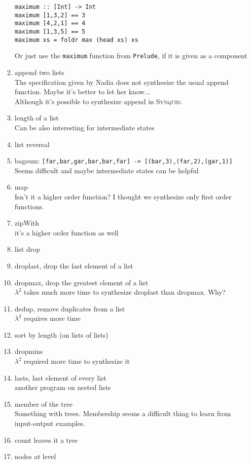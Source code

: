 \begin{enumerate}
\begin{lstlisting}
maximum :: [Int] -> Int
maximum [1,3,2] == 3
maximum [4,2,1] == 4
maximum [1,3,5] == 5
maximum xs = foldr max (head xs) xs
	\end{lstlisting}
	Or just use the \lstinline?maximum? function from \lstinline?Prelude?, if it is given as a component
	\item append two lists\\
	The specification given by Nadia does not synthesize the usual append function. Maybe it's better to let her know...\\
	Although it's possible to synthesize append in \textsc{Synquid}.
	\item length of a list \\
	Can be also interesting for intermediate states
	\item list reversal
	\item bagsum: \lstinline![far,bar,gar,bar,bar,far] -> [(bar,3),(far,2),(gar,1)]!\\
	Seems difficult and maybe intermediate states can be helpful
	\item map \\
	Isn't it a higher order function? I thought we synthesize only first order functions.
	\item zipWith \\
	it's a higher order function as well
	\item list drop
	\item droplast, drop the last element of a list
	\item dropmax, drop the greatest element of a list\\
	$\lambda^2$ takes much more time to synthesize droplast than dropmax. Why?
	\item dedup, remove duplicates from a list \\
	$\lambda^2$ requires more time
	\item sort by length (on lists of lists)
	\item dropmins \\
	$\lambda^2$ required more time to synthesize it
	\item lasts, last element of every list \\
	another program on nested lists
	\item member of the tree\\
	Something with trees. Membership seems a difficult thing to learn from input-output examples.
	\item count leaves it a tree
	\item nodes at level

\end{enumerate}




